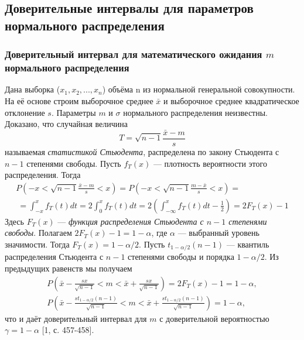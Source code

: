 \documentclass[a4paper]{article}
\begin{document}
\subsection{Доверительные интервалы для параметров нормального распределения}
	\subsubsection{Доверительный интервал для математического ожидания $m$ нормального распределения}
	Дана выборка ($x_{1},x_{2}, ... ,x_{n}$) объёма n из нормальной генеральной совокупности. На её основе строим выборочное среднее $\bar{x}$ и выборочное среднее квадратическое отклонение $s$. Параметры $m$ и $\sigma$ нормального распределения неизвестны.
	\newline
    Доказано, что случайная величина
    \begin{equation}
        T = \sqrt{n - 1}\frac{\bar{x} - m}{s}
        \label{T}
    \end{equation}
    называемая \textit{статистикой Стьюдента}, распределена по закону Стьюдента с $n-1$ степенями свободы. Пусть $f_{T}(x)$ — плотность вероятности этого распределения. Тогда 
    \begin{multline}
        P\left(-x < \sqrt{n - 1}\frac{\bar{x} - m}{s} < x \right) = 
        P\left(-x < \sqrt{n - 1}\frac{m - \bar{x}}{s} < x \right) = \\\
        = \int_{-x}^{x}{f_{T}(t)d t} = 2 \int_{0}^{x}{f_{T}(t)d t} = 
        2\left(  \int_{-\infty}^{x}{f_{T}(t)d t} - \frac{1}{2} \right) = 2F_{T}(x) - 1
        \label{P_f_t}
    \end{multline}
    Здесь $F_{T}(x)$ — \textit{функция распределения Стьюдента с $n-1$ степенями свободы}.
    \newline
    Полагаем $2F_{T}(x)-1 = 1-\alpha$, где $\alpha$ — выбранный уровень значимости. Тогда $F_{T}(x) = 1-\alpha/2$. Пусть $t_{1-\alpha/2}(n-1)$ — квантиль распределения Стьюдента с $n-1$ степенями свободы и порядка $1-\alpha/2$. Из предыдущих равенств мы получаем 
    \begin{equation}
        \begin{split}
             P\left(\bar{x} - \frac{sx}{\sqrt{n-1}} < m <  \bar{x} + \frac{sx}{\sqrt{n-1}}\right) = 2F_{T}(x) - 1 = 1 - \alpha,  \\
             P\left(\bar{x} - \frac{st_{1-\alpha/2}(n−1)}{\sqrt{n-1}} < m <  \bar{x} + \frac{st_{1-\alpha/2}(n−1)}{\sqrt{n-1}}\right)= 1 - \alpha, 
        \label{P_m}     
        \end{split}
    \end{equation}
    что и даёт доверительный интервал для $m$ с доверительной вероятностью $\gamma = 1-\alpha$ [1, с. 457-458].
    
\end{document}
